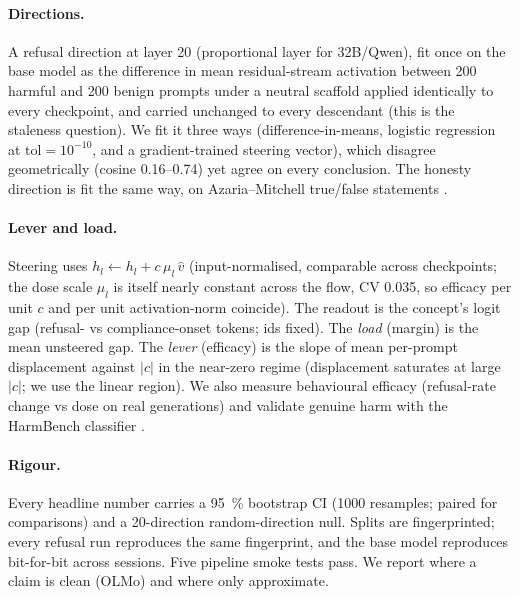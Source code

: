 \documentclass{article}
\begin{document}
\paragraph{Directions.} A refusal direction at layer 20 (proportional layer for 32B/Qwen), fit once
on the base model as the difference in mean residual-stream activation between 200 harmful
\citep{advbench} and 200 benign \citep{alpaca} prompts under a neutral scaffold applied identically
to every checkpoint, and carried unchanged to every descendant (this is the staleness question). We
fit it three ways (difference-in-means, logistic regression at $\text{tol}=10^{-10}$, and a
gradient-trained steering vector), which disagree geometrically (cosine \num{0.16}--\num{0.74}) yet
agree on every conclusion. The honesty direction is fit the same way, on Azaria--Mitchell true/false
statements \citep{azariamitchell}.

\paragraph{Lever and load.} Steering uses $h_l \leftarrow h_l + c\,\mu_l\,\hat{v}$ (input-normalised,
comparable across checkpoints; the dose scale $\mu_l$ is itself nearly constant across the flow, CV \num{0.035}, so efficacy per unit $c$ and per unit activation-norm coincide). The readout is the concept's logit gap (refusal- vs
compliance-onset tokens; ids fixed). The \emph{load} (margin) is the mean unsteered gap. The
\emph{lever} (efficacy) is the slope of mean per-prompt displacement against $|c|$ in the near-zero
regime (displacement saturates at large $|c|$; we use the linear region). We also measure
behavioural efficacy (refusal-rate change vs dose on real generations) and validate genuine harm
with the HarmBench classifier \citep{harmbench}.

\paragraph{Rigour.} Every headline number carries a \SI{95}{\percent} bootstrap CI (1000 resamples;
paired for comparisons) and a 20-direction random-direction null. Splits are fingerprinted; every
refusal run reproduces the same fingerprint, and the base model reproduces bit-for-bit across
sessions. Five pipeline smoke tests pass. We report where a claim is clean (OLMo) and where only
approximate.
\end{document}
